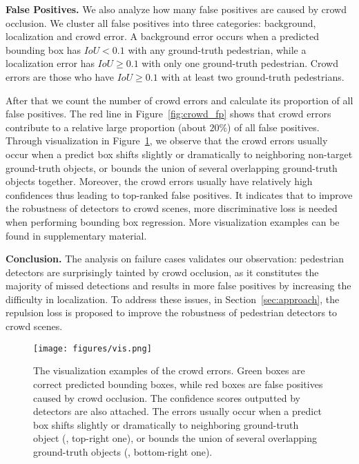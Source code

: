 \documentclass[10pt,twocolumn,letterpaper]{article}
\newcommand{\myparagraph}[1]{{\vspace{0.5em} \noindent \bf #1}}
\begin{document}
\myparagraph{False Positives.}
We also analyze how many false positives are caused by crowd occlusion. We cluster all false positives into three categories: background, localization and crowd error. A background error occurs when a predicted bounding box has $IoU < 0.1$ with any ground-truth pedestrian, while a localization error has $IoU \geq 0.1$ with only one ground-truth pedestrian. Crowd errors are those who have $IoU \geq 0.1$ with at least two ground-truth pedestrians.

After that we count the number of crowd errors and calculate its proportion of all false positives. The red line in Figure~\ref{fig:crowd_fp} shows that crowd errors contribute to a relative large proportion (about $20\%$) of all false positives. Through visualization in Figure~\ref{fig:fp_vis}, we observe that the crowd errors usually occur when a predict box shifts slightly or dramatically to neighboring non-target ground-truth objects, or bounds the union of several overlapping ground-truth objects together. Moreover, the crowd errors usually have relatively high confidences thus leading to top-ranked false positives. It indicates that to improve the robustness of detectors to crowd scenes, more discriminative loss is needed when performing bounding box regression. More visualization examples can be found in supplementary material.

\myparagraph{Conclusion.}
The analysis on failure cases validates our observation: pedestrian detectors are surprisingly tainted by crowd occlusion, as it constitutes the majority of missed detections and results in more false positives by increasing the difficulty in localization. To address these issues, in Section~\ref{sec:approach}, the repulsion loss is proposed to improve the robustness of pedestrian detectors to crowd scenes.

\begin{figure}[t]
\texttt{[image: figures/vis.png]}
\caption{The visualization examples of the crowd errors. Green boxes are correct predicted bounding boxes, while red boxes are false positives caused by crowd occlusion. The confidence scores outputted by detectors are also attached. The errors usually occur when a predict box shifts slightly or dramatically to neighboring ground-truth object (\eg, top-right one), or bounds the union of several overlapping ground-truth objects (\eg, bottom-right one).}
\vspace{-0.2cm}
\label{fig:fp_vis}
\end{figure}
\end{document}
